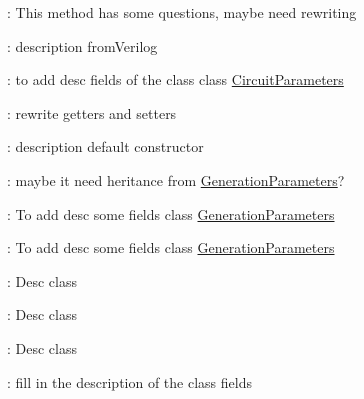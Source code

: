 
\begin{DoxyRefList}
\item[Member \mbox{\hyperlink{classCircuit_a36b3c7e5b6bb762b227620677aa05a4b}{Circuit\+::check\+Existing\+Hash}} ()]\label{todo__todo000003}%
%
\+: This method has some questions, maybe need rewriting  
\item[Member \mbox{\hyperlink{classCircuit_a37ae459501ff0ca329c0e0359f9e436d}{Circuit\+::from\+Verilog}} (const std\+::string \&i\+\_\+filepath)]\label{todo__todo000002}%
%
\+: description from\+Verilog  
\item[Class \mbox{\hyperlink{classCircuitParameters}{Circuit\+Parameters}} ]\label{todo__todo000004}%
%
\+: to add desc fields of the class class \mbox{\hyperlink{classCircuitParameters}{Circuit\+Parameters}} 
\item[Member \mbox{\hyperlink{classCircuitParameters_a17bcb9155be908afffe815b8e639d494}{Circuit\+Parameters\+::d\+\_\+name}} ]\label{todo__todo000005}%
%
\+: rewrite getters and setters  
\item[Member \mbox{\hyperlink{classDataBaseGenerator_a00481fbb8c06d03bda84618f1423df59}{Data\+Base\+Generator\+::Data\+Base\+Generator}} (const \mbox{\hyperlink{classDataBaseGeneratorParameters}{Data\+Base\+Generator\+Parameters}} \&i\+\_\+parameters)]\label{todo__todo000006}%
%
\+: description default constructor  
\item[Class \mbox{\hyperlink{classDataBaseGeneratorParameters}{Data\+Base\+Generator\+Parameters}} ]\label{todo__todo000007}%
%
\+: maybe it need heritance from \mbox{\hyperlink{classGenerationParameters}{Generation\+Parameters}}?  
\item[Class \mbox{\hyperlink{classGenerationParameters}{Generation\+Parameters}} ]\label{todo__todo000013}%
%
\+: To add desc some fields class \mbox{\hyperlink{classGenerationParameters}{Generation\+Parameters}} 

\label{todo__todo000012}%
%
\+: To add desc some fields class \mbox{\hyperlink{classGenerationParameters}{Generation\+Parameters}}  
\item[Class \mbox{\hyperlink{classGeneratorALUParameters}{Generator\+ALUParameters}} ]\label{todo__todo000011}%
%
\+: Desc class  
\item[Class \mbox{\hyperlink{classGeneratorComparisonParameters}{Generator\+Comparison\+Parameters}} ]\label{todo__todo000009}%
%
\+: Desc class  
\item[Class \mbox{\hyperlink{classGeneratorSubtractorParameters}{Generator\+Subtractor\+Parameters}} ]\label{todo__todo000010}%
%
\+: Desc class  
\item[Class \mbox{\hyperlink{classGeneticParameters}{Genetic\+Parameters}} ]\label{todo__todo000014}%
%
\+: fill in the description of the class fields


\end{DoxyRefList}
